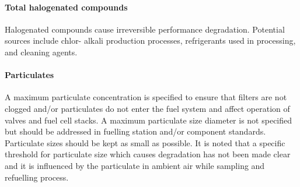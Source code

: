 \paragraph{Total halogenated compounds} 
Halogenated compounds cause irreversible performance degradation. Potential sources include chlor- alkali production processes, refrigerants used in processing, and cleaning agents.

\paragraph{Particulates}
A maximum particulate concentration is specified to ensure that filters are not clogged and/or particulates do not enter the fuel system and affect operation of valves and fuel cell stacks. A maximum particulate size diameter is not specified but should be addressed in fuelling station and/or component standards. Particulate sizes should be kept as small as possible. It is noted that a specific threshold for particulate size which causes degradation has not been made clear and it is influenced by the particulate in ambient air while sampling and refuelling process.

